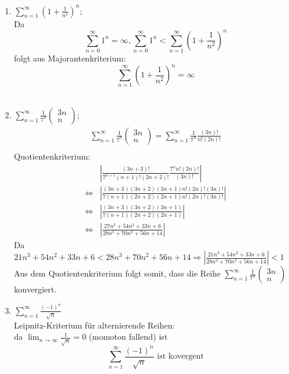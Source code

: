 \documentclass{HM}
\begin{document}
\begin{enumerate}
\begin{enumerate}
\item $\sum\limits_{n=1}^\infty(1+\frac{1}{n^2})^n$;\\
Da $$\sum\limits_{n=0}^\infty 1^n = \infty, \sum\limits_{n=0}^\infty 1^n < \sum\limits_{n=1}^\infty(1+\frac{1}{n^2})^n$$
folgt aus Majorantenkriterium: \\
$$\sum\limits_{n=1}^\infty(1+\frac{1}{n^2})^n = \infty$$
\\
\item $\sum\limits_{n=1}^\infty\frac{1}{7^n}\begin{pmatrix}
3n\\
n
\end{pmatrix}$;\\
\begin{align*}
	\sum\limits_{n=1}^\infty\frac{1}{7^n}
	\begin{pmatrix}
		3n\\
		n
	\end{pmatrix}
	=\sum\limits_{n=1}^\infty\frac{1}{7^n} \frac{(3n)!}{n!(2n)!}\\
\end{align*}
Quotientenkriterium:
\begin{align*}
	&\left|\frac{(3n+3)!}{7^{n+1}(n+1)!(2n+2)!}\frac{7^nn!(2n)!}{(3n)!}\right|\\
	\Leftrightarrow &\left|\frac{(3n+3)(3n+2)(3n+1)n!(2n)!(3n)!}{7(n+1)(2n+2)(2n+1)n!(2n)!(3n)!}\right|\\
	\Leftrightarrow &\left|\frac{(3n+3)(3n+2)(3n+1)}{7(n+1)(2n+2)(2n+1)}\right|\\
	\Leftrightarrow &\left|\frac{27n^3+54n^2+33n+6}{28n^3+70n^2+56n+14}\right|
	\end{align*}
	Da $21n^3+54n^2+33n+6<28n^3+70n^2+56n+14 \Rightarrow \left|\frac{21n^3+54n^2+33n+6}{28n^3+70n^2+56n+14}\right|<1$
\\
Aus dem Quotientenkriterium folgt somit, dass die Reihe $\sum\limits_{n=1}^\infty\frac{1}{7^n}\begin{pmatrix}
3n\\
n
\end{pmatrix}$ konvergiert.
\item $\sum\limits_{n=1}^\infty\frac{(-1)^n}{\sqrt{n}}$\\
Leipnitz-Kriterium für alternierende Reihen:\\
da $\lim_{n\to\infty} \frac{1}{\sqrt{n}} = 0$ (momoton fallend) ist $$\sum\limits_{n=1}^\infty\frac{(-1)^n}{\sqrt{n}}\text{ ist kovergent}$$ 

\end{enumerate}

\end{enumerate}
\end{document}
